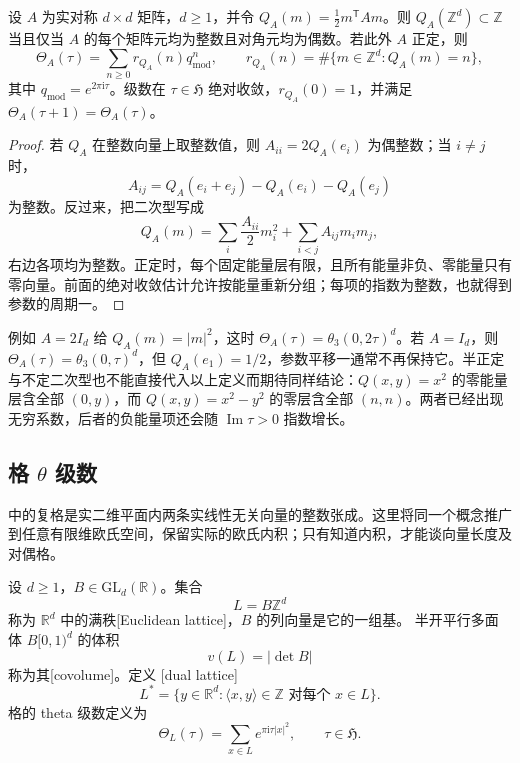 \begin{proposition}[整数值的矩阵条件]\label{b3:prop:24-even-matrix}
设 \(A\) 为实对称 \(d\times d\) 矩阵，\(d\ge1\)，并令
\(Q_A(m)=\tfrac12m^{\mathsf T}Am\)。则 \(Q_A(\mathbb Z^d)\subset\mathbb Z\)
当且仅当 \(A\) 的每个矩阵元均为整数且对角元均为偶数。若此外 \(A\) 正定，则
\[
 \Theta_A(\tau)=\sum_{n\ge0}r_{Q_A}(n)q_{\mathrm{mod}}^n,\qquad
 r_{Q_A}(n)=\#\{m\in\mathbb Z^d:Q_A(m)=n\},
\]
其中 \(q_{\mathrm{mod}}=e^{2\pi\mathrm{i}\tau}\)。级数在 \(\tau\in\mathfrak H\) 绝对收敛，\(r_{Q_A}(0)=1\)，并满足
\(\Theta_A(\tau+1)=\Theta_A(\tau)\)。
\end{proposition}
\begin{proof}
若 \(Q_A\) 在整数向量上取整数值，则
\(A_{ii}=2Q_A(e_i)\) 为偶整数；当 \(i\ne j\) 时，
\[
 A_{ij}=Q_A(e_i+e_j)-Q_A(e_i)-Q_A(e_j)
\]
为整数。反过来，把二次型写成
\[
 Q_A(m)=\sum_i\frac{A_{ii}}2m_i^2+\sum_{i<j}A_{ij}m_im_j,
\]
右边各项均为整数。正定时，每个固定能量层有限，且所有能量非负、零能量只有零向量。前面的绝对收敛估计允许按能量重新分组；每项的指数为整数，也就得到参数的周期一。
\end{proof}

例如 \(A=2I_d\) 给 \(Q_A(m)=|m|^2\)，这时
\(\Theta_A(\tau)=\theta_3(0,2\tau)^d\)。若 \(A=I_d\)，则
\(\Theta_A(\tau)=\theta_3(0,\tau)^d\)，但 \(Q_A(e_1)=1/2\)，参数平移一通常不再保持它。半正定与不定二次型也不能直接代入以上定义而期待同样结论：\(Q(x,y)=x^2\) 的零能量层含全部 \((0,y)\)，而 \(Q(x,y)=x^2-y^2\) 的零层含全部 \((n,n)\)。两者已经出现无穷系数，后者的负能量项还会随 \(\operatorname{Im}\tau>0\) 指数增长。

\subsection{格 \texorpdfstring{\(\theta\)}{\AnalysisPdfTheta} 级数}
\label{b3:subsec:240502}

中的复格是实二维平面内两条实线性无关向量的整数张成。这里将同一个概念推广到任意有限维欧氏空间，保留实际的欧氏内积；只有知道内积，才能谈向量长度及对偶格。

\begin{definition}\label{b3:def:24-euclidean-lattice}
设 \(d\ge1\)，\(B\in\mathrm{GL}_d(\mathbb R)\)。集合
\[
 L=B\mathbb Z^d
\]
称为 \(\mathbb R^d\) 中的满秩[Euclidean lattice]，\(B\) 的列向量是它的一组基。
半开平行多面体 \(B[0,1)^d\) 的体积
\[
 v(L)=|\det B|
\]
称为其[covolume]。定义
[dual lattice]
\[
 L^*=\{y\in\mathbb R^d:\langle x,y\rangle\in\mathbb Z
                         \text{ 对每个 }x\in L\}.
\]
格的 theta 级数定义为
\[
 \Theta_L(\tau)=\sum_{x\in L}e^{\pi\mathrm{i}\tau|x|^2},
 \qquad \tau\in\mathfrak H.
\]
\end{definition}

